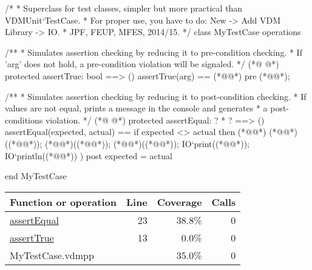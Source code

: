 \begin{vdmpp}[breaklines=true]
/*
 * Superclass for test classes, simpler but more practical than VDMUnit`TestCase.
 * For proper use, you have to do: New -> Add VDM Library -> IO.
 * JPF, FEUP, MFES, 2014/15.
 */
class MyTestCase
operations

  /**
   * Simulates assertion checking by reducing it to pre-condition checking.
   * If 'arg' does not hold, a pre-condition violation will be signaled.
   */
(*@
\label{assertTrue:13}
@*)
  protected assertTrue: bool ==> ()
  assertTrue(arg) ==
    (*@@*)
  pre (*@@*);

  /**
   * Simulates assertion checking by reducing it to post-condition checking.
   * If values are not equal, prints a message in the console and generates
   * a post-conditions violation.
   */
(*@
\label{assertEqual:23}
@*)
  protected assertEqual: ? * ? ==> ()
  assertEqual(expected, actual) ==
    if expected <> actual then (*@\vdmnotcovered{(}@*)
      (*@@*)((*@@*));
      (*@@*)((*@@*));
      (*@@*)((*@@*));
      IO`print((*@@*));
      IO`println((*@@*))
    )
  post expected = actual

end MyTestCase
\end{vdmpp}
\bigskip
\begin{longtable}{|l|r|r|r|}
\hline
Function or operation & Line & Coverage & Calls \\
\hline
\hline
\hyperref[assertEqual:23]{assertEqual} & 23&38.8\% & 0 \\
\hline
\hyperref[assertTrue:13]{assertTrue} & 13&0.0\% & 0 \\
\hline
\hline
MyTestCase.vdmpp & & 35.0\% & 0 \\
\hline
\end{longtable}

